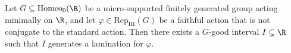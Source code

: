 \documentclass[reqno]{amsart}
\begin{document}
\begin{lema} \label{lema:BMRT}
	Let $G \subseteq \mathrm{Homeo}_0(\R)$ be a micro-supported finitely generated group acting minimally on $\R$, and let $\varphi \in \mathrm{Rep}_\mathrm{III}(G)$ be a faithful action that is not conjugate to the standard action. Then there exists a $G$-good interval $I \subsetneq \R$ such that $I$ generates a lamination for $\varphi$.
\end{lema}
\end{document}
